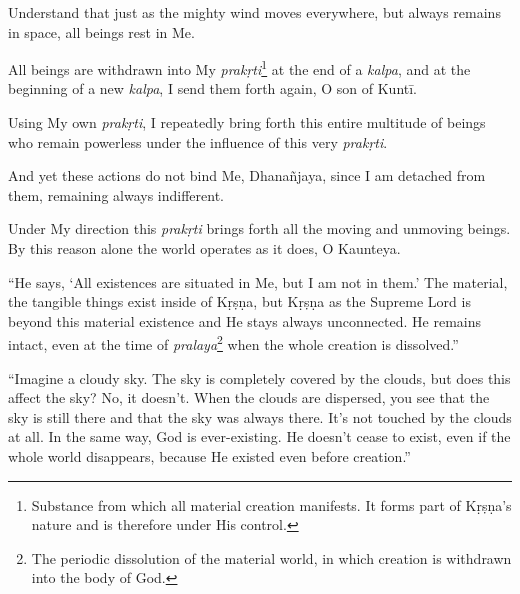 {Understand that just as the mighty wind moves everywhere, but always remains in space, all beings rest in Me.}

{All beings are withdrawn into My \textit{prakṛti}\footnote{Substance from which all material creation manifests. It forms part of Kṛṣṇa's nature and is therefore under His control.} at the end of a \textit{kalpa}, and at the beginning of a new \textit{kalpa}, I send them forth again, O son of Kuntī.}

{Using My own \textit{prakṛti}, I repeatedly bring forth this entire multitude of beings who remain powerless under the influence of this very \textit{prakṛti}.}

{And yet these actions do not bind Me, Dhanañjaya, since I am detached from them, remaining always indifferent.}

{Under My direction this \textit{prakṛti} brings forth all the moving and unmoving beings. By this reason alone the world operates as it does, O Kaunteya.}

\enquote{He says, \enquote{All existences are situated in Me, but I am not in them.} The material, the tangible things exist inside of Kṛṣṇa, but Kṛṣṇa as the Supreme Lord is beyond this material existence and He stays always unconnected. He remains intact, even at the time of \textit{pralaya}\footnote{The periodic dissolution of the material world, in which creation is withdrawn into the body of God.} when the whole creation is dissolved.}

\enquote{Imagine a cloudy sky. The sky is completely covered by the clouds, but does this affect the sky? No, it doesn’t. When the clouds are dispersed, you see that the sky is still there and that the sky was always there. It’s not touched by the clouds at all. In the same way, God is ever-existing. He doesn’t cease to exist, even if the whole world disappears, because He existed even before creation.}

